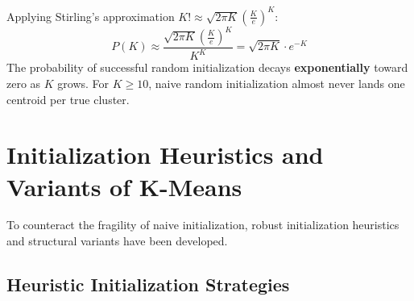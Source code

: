 Applying Stirling's approximation $K! \approx \sqrt{2\pi K} \left(\frac{K}{e}\right)^K$:
\begin{equation}
    P(K) \approx \frac{\sqrt{2\pi K} \left(\frac{K}{e}\right)^K}{K^K} = \sqrt{2\pi K} \cdot e^{-K}
\end{equation}
The probability of successful random initialization decays \textbf{exponentially} toward zero as $K$ grows. For $K \ge 10$, naive random initialization almost never lands one centroid per true cluster.

\section{Initialization Heuristics and Variants of K-Means}
\label{sec:dm-kmeans-heuristics-variants}

To counteract the fragility of naive initialization, robust initialization heuristics and structural variants have been developed.

\subsection{Heuristic Initialization Strategies}

